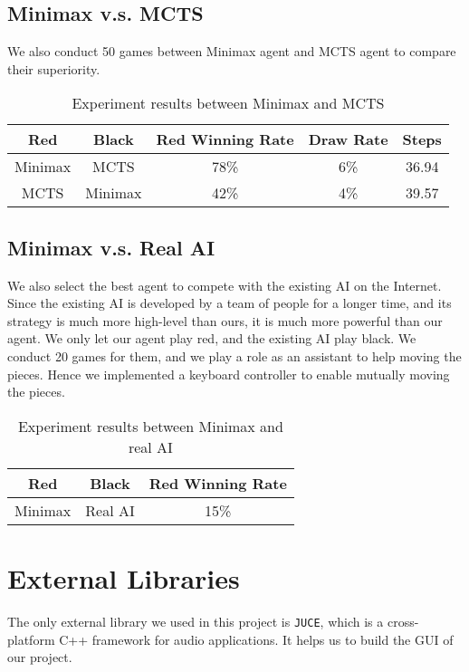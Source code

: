 \documentclass[letterpaper]{article}
\begin{document}
\subsection{Minimax v.s. MCTS}
\label{subsec:minimax-v.s.-mcts}
We also conduct 50 games between Minimax agent and MCTS agent to compare their superiority.
\begin{table}[htbp]
    \centering
    \caption{Experiment results between Minimax and MCTS}
    \label{tab:tab2}
    \begin{tabular}{|c|c|c|c|c|}
        \hline
        Red & Black & Red Winning Rate & Draw Rate & Steps  \\ \hline
        Minimax & MCTS & 78\% & 6\% & 36.94 \\ \hline
        MCTS & Minimax & 42\% & 4\% & 39.57 \\ \hline
    \end{tabular}
\end{table}

\subsection{Minimax v.s. Real AI}
\label{subsec:minimax-v.s.-real-ai}
We also select the best agent to compete with the existing AI on the Internet.
Since the existing AI is developed by a team of people for a longer time, and its strategy is much more high-level than ours, it is much more powerful than our agent.
We only let our agent play red, and the existing AI play black. We conduct 20 games for them, and we play a role as an assistant to help moving the pieces.
Hence we implemented a keyboard controller to enable mutually moving the pieces.
\begin{table}[htbp]
    \centering
    \caption{Experiment results between Minimax and real AI}
    \label{tab:tab3}
    \begin{tabular}{|c|c|c|}
        \hline
        Red & Black & Red Winning Rate  \\ \hline
        Minimax & Real AI & 15\% \\ \hline
    \end{tabular}
\end{table}


\section{External Libraries}\label{sec:acknowledgements}

The only external library we used in this project is \texttt{JUCE}, which is a cross-platform C++ framework for audio applications.
It helps us to build the GUI of our project.



\end{document}
